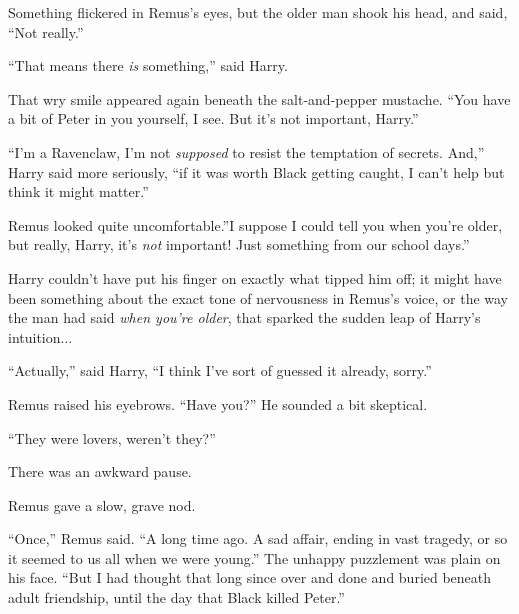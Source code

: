 Something flickered in Remus's eyes, but the older man shook his head,
and said, ``Not really.''

``That means there \emph{is} something,'' said Harry.

That wry smile appeared again beneath the salt-and-pepper mustache.
``You have a bit of Peter in you yourself, I see. But it's not
important, Harry.''

``I'm a Ravenclaw, I'm not \emph{supposed} to resist the temptation of
secrets. And,'' Harry said more seriously, ``if it was worth Black
getting caught, I can't help but think it might matter.''

Remus looked quite uncomfortable.''I suppose I could tell you when
you're older, but really, Harry, it's \emph{not} important! Just
something from our school days.''

Harry couldn't have put his finger on exactly what tipped him off; it
might have been something about the exact tone of nervousness in Remus's
voice, or the way the man had said \emph{when you're older}, that
sparked the sudden leap of Harry's intuition...

``Actually,'' said Harry, ``I think I've sort of guessed it already,
sorry.''

Remus raised his eyebrows. ``Have you?'' He sounded a bit skeptical.

``They were lovers, weren't they?''

There was an awkward pause.

Remus gave a slow, grave nod.

``Once,'' Remus said. ``A long time ago. A sad affair, ending in vast
tragedy, or so it seemed to us all when we were young.'' The unhappy
puzzlement was plain on his face. ``But I had thought that long since
over and done and buried beneath adult friendship, until the day that
Black killed Peter.''
